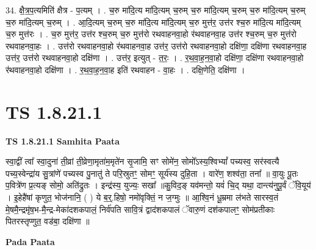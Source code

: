 \documentclass[17pt]{extarticle}
\begin{document}
34. क्षै॒त्र॒प॒त्यमिति॑ क्षैत्र - प॒त्यम् । . च॒रु मा॑दि॒त्य मा॑दि॒त्यम् च॒रुम् च॒रु मा॑दि॒त्यम् च॒रुम् च॒रु मा॑दि॒त्यम् च॒रुम् च॒रु मा॑दि॒त्यम् च॒रुम् । . आ॒दि॒त्यम् च॒रुम् च॒रु मा॑दि॒त्य मा॑दि॒त्यम् च॒रु मुत्त॑र॒ उत्त॑र श्च॒रु मा॑दि॒त्य मा॑दि॒त्यम् च॒रु मुत्त॑रः । . च॒रु मुत्त॑र॒ उत्त॑र श्च॒रुम् च॒रु मुत्त॑रो रथवाहनवा॒हो र॑थवाहनवा॒ह उत्त॑र श्च॒रुम् च॒रु मुत्त॑रो रथवाहनवा॒हः । . उत्त॑रो रथवाहनवा॒हो र॑थवाहनवा॒ह उत्त॑र॒ उत्त॑रो रथवाहनवा॒हो दक्षि॑णा॒ दक्षि॑णा रथवाहनवा॒ह उत्त॑र॒ उत्त॑रो रथवाहनवा॒हो दक्षि॑णा । . उत्त॑र॒ इत्युत् - त॒रः॒ । . र॒थ॒वा॒ह॒न॒वा॒हो दक्षि॑णा॒ दक्षि॑णा रथवाहनवा॒हो र॑थवाहनवा॒हो दक्षि॑णा । . र॒थ॒वा॒ह॒न॒वा॒ह इति॑ रथवाहन - वा॒हः । . दक्षि॒णेति॒ दक्षि॑णा । \newline
\pagebreak
{}

\section{ TS 1.8.21.1 }

\textbf{TS 1.8.21.1 } \newline
\textbf{Samhita Paata} \newline

स्वा॒द्वीं त्वा᳚ स्वा॒दुना॑ ती॒व्रां ती॒व्रेणा॒मृता॑म॒मृते॑न सृ॒जामि॒ सꣳ सोमे॑न॒ सोमो᳚ऽस्य॒श्विभ्यां᳚ पच्यस्व॒ सर॑स्वत्यै पच्य॒स्वेन्द्रा॑य सु॒त्रांणे॑ पच्यस्व पु॒नातु॑ ते परि॒स्रुतꣳ॒॒ सोमꣳ॒॒ सूर्य॑स्य दुहि॒ता । वारे॑ण॒ शश्व॑ता॒ तना᳚ ॥ वा॒युः पू॒तः प॒वित्रे॑ण प्र॒त्यङ् सोमो॒ अति॑द्रुतः । इन्द्र॑स्य॒ युज्यः॒ सखा᳚ ॥कु॒विद॒ङ् यव॑मन्तो॒ यवं॑ चि॒द् यथा॒  दान्त्य॑नुपू॒र्वं ॅवि॒यूय॑ । इ॒हेहै॑षां कृणुत॒ भोज॑नानि॒ ( ) ये ब॒र्॒.हिषो॒ नमो॑वृक्तिं॒ न ज॒ग्मुः ॥ आ॒श्वि॒नं धू॒म्रमा ल॑भते सारस्व॒तं मे॒षमै॒न्द्रमृ॑ष॒भ-मै॒न्द्र-मेका॑दशकपालं॒ निर्व॑पति सावि॒त्रं द्वाद॑शकपालं ॅवारु॒णं दश॑कपालꣳ॒॒ सोम॑प्रतीकाः पितरस्तृप्णुत॒ वड॑बा॒ दक्षि॑णा ॥ \newline

\textbf{Pada Paata} \newline
\end{document}
